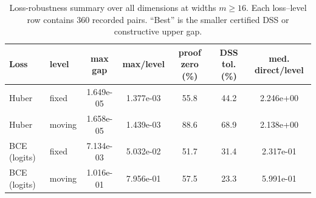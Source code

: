 \begin{table}[t]
\caption{Loss-robustness summary over all dimensions at widths $m\ge16$. Each loss--level row contains 360 recorded pairs. ``Best'' is the smaller certified DSS or constructive upper gap.}
\label{tab:loss-robustness}
\centering
\scriptsize
\setlength{\tabcolsep}{2.2pt}
\begin{tabular}{@{}llccccc@{}}
\toprule
Loss & level & max gap & max/level & proof zero (\%) & DSS tol. (\%) & med. direct/level \\
\midrule
Huber & fixed & 1.649e-05 & 1.377e-03 & 55.8 & 44.2 & 2.246e+00 \\
Huber & moving & 1.658e-05 & 1.439e-03 & 88.6 & 68.9 & 2.138e+00 \\
BCE (logits) & fixed & 7.134e-03 & 5.032e-02 & 51.7 & 31.4 & 2.317e-01 \\
BCE (logits) & moving & 1.016e-01 & 7.956e-01 & 57.5 & 23.3 & 5.991e-01 \\
\bottomrule
\end{tabular}
\end{table}
